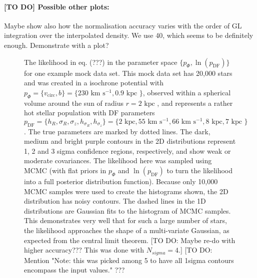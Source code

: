 \documentclass[12pt,preprint]{aastex}
\begin{document}
\paragraph{[TO DO] Possible other plots:} Maybe show also how the normalisation accuracy varies with the order of GL integration over the interpolated density. We use 40, which seems to be definitely enough. Demonstrate with a plot?



\begin{figure}
\caption{The likelihood in eq. (???) in the parameter space $\{p_\Phi,\ln(p_\text{DF})\}$ for one example mock data set. This mock data set has 20,000 stars and was created in a isochrone potential with $p_\Phi = \{v_\text{circ},b \}=\{230 \text{ km s$^{-1}$},0.9\text{ kpc } \}$, observed within a spherical volume around the sun of radius $r = 2 \text{ kpc }$, and represents a rather hot stellar population with DF parameters $p_\text{DF} = \{ h_R, \sigma_R, \sigma_z,h_{\sigma_R},h_{\sigma_z}\} =\{2 \text{ kpc}, 55 \text{ km s$^{-1}$}, 66 \text{ km s$^{-1}$}, 8 \text{ kpc}, 7 \text{ kpc }\} $.  The true parameters are marked by dotted lines. The dark, medium and bright purple contours in the 2D distributions represent 1, 2 and 3 sigma confidence regions, respectively, and show weak or moderate covariances. The likelihood here was sampled using MCMC (with flat priors in $p_\Phi$ and  $\ln(p_\text{DF})$ to turn the likelihood into a full posterior distribution function). Because only 10,000 MCMC samples were used to create the histograms shown, the 2D distribution has noisy contours. The dashed lines in the 1D distributions are Gaussian fits to the histogram of MCMC samples. This demonstrates very well that for such a large number of stars, the likelihood approaches the shape of a multi-variate Gaussian, as expected from the central limit theorem. [TO DO: Maybe re-do with higher accuracy??? This was done with $N_{sigma} = 4$.] [TO DO: Mention "Note: this was picked among 5 to have all 1sigma contours encompass the input values." ???}
\label{fig:triangleplot}
\end{figure}
\end{document}

